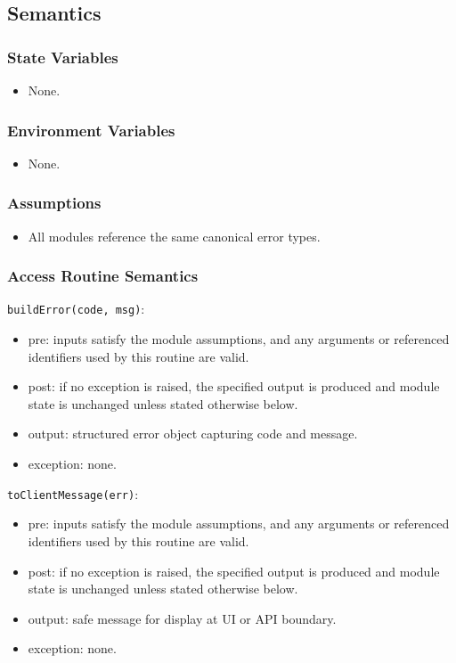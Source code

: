 \documentclass[12pt, titlepage]{article}
\begin{document}
\subsection{Semantics}

\subsubsection{State Variables}
\begin{itemize}
    \item None.
\end{itemize}

\subsubsection{Environment Variables}
\begin{itemize}
    \item None.
\end{itemize}

\subsubsection{Assumptions}
\begin{itemize}
    \item All modules reference the same canonical error types.
\end{itemize}

\subsubsection{Access Routine Semantics}

\noindent \texttt{buildError(code, msg)}:
\begin{itemize}
    \item pre: inputs satisfy the module assumptions, and any arguments or referenced identifiers used by this routine are valid.
    \item post: if no exception is raised, the specified output is produced and module state is unchanged unless stated otherwise below.
    \item output: structured error object capturing code and message.
    \item exception: none.
\end{itemize}

\noindent \texttt{toClientMessage(err)}:
\begin{itemize}
    \item pre: inputs satisfy the module assumptions, and any arguments or referenced identifiers used by this routine are valid.
    \item post: if no exception is raised, the specified output is produced and module state is unchanged unless stated otherwise below.
    \item output: safe message for display at UI or API boundary.
    \item exception: none.
\end{itemize}
\end{document}

